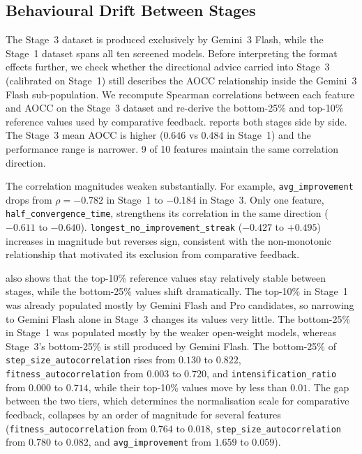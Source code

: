\subsection{Behavioural Drift Between Stages}
\label{sec:results-drift}

The Stage~3 dataset is produced exclusively by Gemini~3 Flash, while the Stage~1 dataset spans all ten screened models. Before interpreting the format effects further, we check whether the directional advice carried into Stage~3 (calibrated on Stage~1) still describes the AOCC relationship inside the Gemini~3 Flash sub-population. We recompute Spearman correlations between each feature and AOCC on the Stage~3 dataset and re-derive the bottom-25\% and top-10\% reference values used by comparative feedback.  reports both stages side by side. The Stage~3 mean AOCC is higher ($0.646$ vs $0.484$ in Stage~1) and the performance range is narrower. 9 of 10 features maintain the same correlation direction.

The correlation magnitudes weaken substantially. For example, \texttt{avg\_improvement} drops from $\rho = -0.782$ in Stage~1 to $-0.184$ in Stage~3. Only one feature, \texttt{half\_convergence\_time}, strengthens its correlation in the same direction ($-0.611$ to $-0.640$). \texttt{longest\_no\_improvement\_streak} ($-0.427$ to $+0.495$) increases in magnitude but reverses sign, consistent with the non-monotonic relationship that motivated its exclusion from comparative feedback.

 also shows that the top-10\% reference values stay relatively stable between stages, while the bottom-25\% values shift dramatically. The top-10\% in Stage~1 was already populated mostly by Gemini Flash and Pro candidates, so narrowing to Gemini Flash alone in Stage~3 changes its values very little. The bottom-25\% in Stage~1 was populated mostly by the weaker open-weight models, whereas Stage~3's bottom-25\% is still produced by Gemini Flash. The bottom-25\% of \texttt{step\_size\_autocorrelation} rises from $0.130$ to $0.822$, \texttt{fitness\_autocorrelation} from $0.003$ to $0.720$, and \texttt{intensification\_ratio} from $0.000$ to $0.714$, while their top-10\% values move by less than $0.01$. The gap between the two tiers, which determines the normalisation scale for comparative feedback, collapses by an order of magnitude for several features (\texttt{fitness\_autocorrelation} from $0.764$ to $0.018$, \texttt{step\_size\_autocorrelation} from $0.780$ to $0.082$, and \texttt{avg\_improvement} from $1.659$ to $0.059$).

